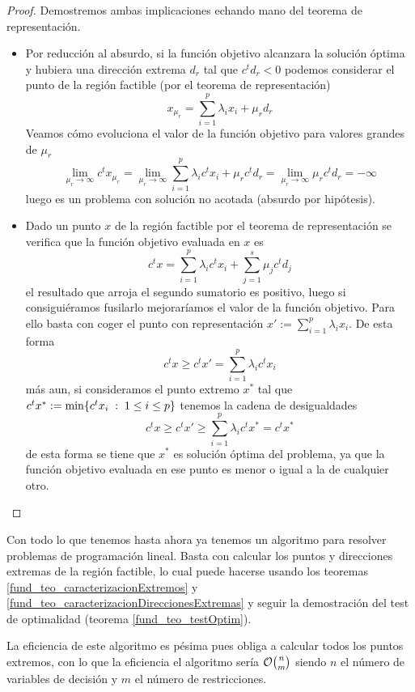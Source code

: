 \begin{proof}Demostremos ambas implicaciones echando mano del teorema de representación.
	\begin{itemize}
		\item[\bra] Por reducción al absurdo, si la función objetivo alcanzara la solución óptima y hubiera una dirección extrema $d_r$ tal que $c^td_r<0$ podemos considerar el punto de la región factible (por el teorema de representación)
		\begin{equation*}
			x_{\mu_r}=\sum_{i=1}^{p}\lambda_ix_i+\mu_rd_r
		\end{equation*}
		Veamos cómo evoluciona el valor de la función objetivo para valores grandes de $\mu_r$
		\begin{equation*}
			\lim\limits_{\mu_r\to\infty}c^tx_{\mu_r}=\lim\limits_{\mu_r\to\infty}\sum_{i=1}^{p}\lambda_ic^tx_i+\mu_rc^td_r=\lim\limits_{\mu_r\to\infty}\mu_rc^td_r=-\infty
		\end{equation*}
		luego es un problema con solución no acotada (absurdo por hipótesis).
		\item[\bla]Dado un punto $x$ de la región factible por el teorema de representación se verifica que la función objetivo evaluada en $x$ es\begin{equation*}
			c^tx=\sum_{i=1}^{p}\lambda_ic^tx_i+\sum_{j=1}^{s}\mu_jc^td_j
		\end{equation*} el resultado que arroja el segundo sumatorio es positivo, luego si consiguiéramos fusilarlo mejoraríamos el valor de la función objetivo. Para ello basta con coger el punto con representación $x':=\sum_{i=1}^{p}\lambda_ix_i$. De esta forma
		\begin{equation*}
			c^tx\geq c^tx'=\sum_{i=1}^{p}\lambda_ic^tx_i
		\end{equation*} más aun, si consideramos el punto extremo $x^*$ tal que $c^tx^*:=\min\{c^tx_i\;:\; 1\leq i\leq p\}$ tenemos la cadena de desigualdades \begin{equation*}
		c^tx\geq c^tx'\geq \sum_{i=1}^{p}\lambda_ic^tx^*=c^tx^*
	\end{equation*} de esta forma se tiene que $x^*$ es solución óptima del problema, ya que la función objetivo evaluada en ese punto es menor o igual a la de cualquier otro.\qedhere
	\end{itemize}
\end{proof}
\begin{obs}
	Con todo lo que tenemos hasta ahora ya tenemos un algoritmo para resolver problemas de programación lineal. Basta con calcular los puntos y direcciones extremas de la región factible, lo cual puede hacerse usando los teoremas \ref{fund_teo_caracterizacionExtremos} y \ref{fund_teo_caracterizacionDireccionesExtremas} y seguir la demostración del test de optimalidad (teorema \ref{fund_teo_testOptim}).
	
	La eficiencia de este algoritmo es pésima pues obliga a calcular todos los puntos extremos, con lo que la eficiencia el algoritmo sería $\mathcal{O}\binom{n}{m}$ siendo $n$ el número de variables de decisión y $m$ el número de restricciones.
\end{obs}
